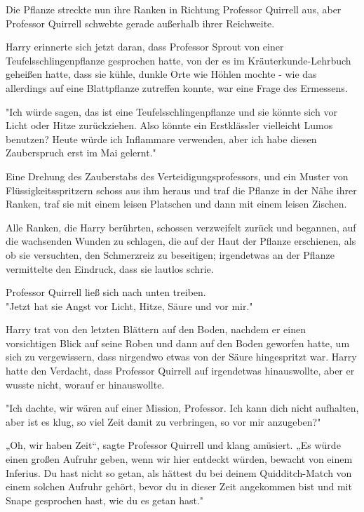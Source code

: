 {Die Pflanze streckte nun ihre Ranken in Richtung Professor Quirrell aus, aber Professor Quirrell schwebte gerade außerhalb ihrer Reichweite.

Harry erinnerte sich jetzt daran, dass Professor Sprout von einer Teufelsschlingenpflanze gesprochen hatte, von der es im Kräuterkunde-Lehrbuch geheißen hatte, dass sie kühle, dunkle Orte wie Höhlen mochte - wie das allerdings auf eine Blattpflanze zutreffen konnte, war eine Frage des Ermessens.

"Ich würde sagen, das ist eine Teufelsschlingenpflanze und sie könnte sich vor Licht oder Hitze zurückziehen. Also könnte ein Erstklässler vielleicht Lumos benutzen? Heute würde ich Inflammare verwenden, aber ich habe diesen Zauberspruch erst im Mai gelernt."

Eine Drehung des Zauberstabs des Verteidigungsprofessors, und ein Muster von Flüssigkeitsspritzern schoss aus ihm heraus und traf die Pflanze in der Nähe ihrer Ranken, traf sie mit einem leisen Platschen und dann mit einem leisen Zischen.

Alle Ranken, die Harry berührten, schossen verzweifelt zurück und begannen, auf die wachsenden Wunden zu schlagen, die auf der Haut der Pflanze erschienen, als ob sie versuchten, den Schmerzreiz zu beseitigen; irgendetwas an der Pflanze vermittelte den Eindruck, dass sie lautlos schrie.

Professor Quirrell ließ sich nach unten treiben.\\ "Jetzt hat sie Angst vor Licht, Hitze, Säure und vor mir."

Harry trat von den letzten Blättern auf den Boden, nachdem er einen vorsichtigen Blick auf seine Roben und dann auf den Boden geworfen hatte, um sich zu vergewissern, dass nirgendwo etwas von der Säure hingespritzt war. Harry hatte den Verdacht, dass Professor Quirrell auf irgendetwas hinauswollte, aber er wusste nicht, worauf er hinauswollte.

"Ich dachte, wir wären auf einer Mission, Professor. Ich kann dich nicht aufhalten, aber ist es klug, so viel Zeit damit zu verbringen, so vor mir anzugeben?"

„Oh, wir haben Zeit“, sagte Professor Quirrell und klang amüsiert. „Es würde einen großen Aufruhr geben, wenn wir hier entdeckt würden, bewacht von einem Inferius. Du hast nicht so getan, als hättest du bei deinem Quidditch-Match von einem solchen Aufruhr gehört, bevor du in dieser Zeit angekommen bist und mit Snape gesprochen hast, wie du es getan hast."

}

